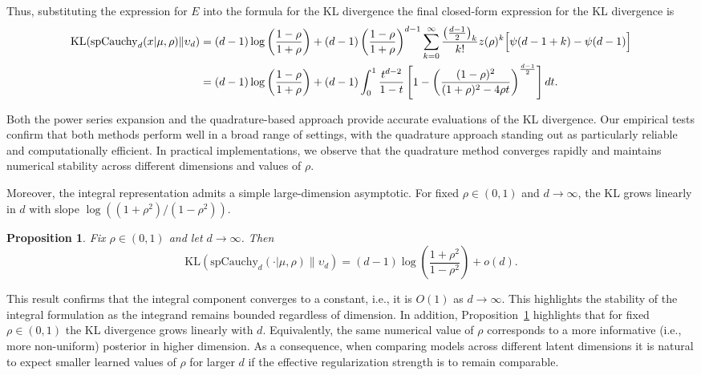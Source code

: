 \documentclass{article}
\newtheorem{prop}{Proposition}
\begin{document}
Thus, substituting the expression for \(E\) into the formula for the KL divergence the final closed-form expression for the KL divergence is
{\small
\begin{align*}
 \mathrm{KL}(\mathrm{spCauchy}_d(x | \mu, \rho) \| \upsilon_d) & = (d-1)\log\left(\frac{1-\rho}{1+\rho}\right) + (d-1)\left(\frac{1-\rho}{1+\rho}\right)^{d-1}\sum_{k=0}^{\infty}\frac{\left(\frac{d-1}{2}\right)_k}{k!}z(\rho)^k\Bigl[\psi(d-1+k)-\psi(d-1)\Bigr] \\
     & = (d-1)\log\left(\frac{1-\rho}{1+\rho}\right) + (d-1) \int_0^1 \frac{t^{d-2}}{1-t} \left[1 - \left(\frac{(1 -\rho)^2}{(1+\rho)^2 - 4 \rho t}\right)^{\frac{d-1}{2}} \right] dt.
\end{align*}
}

Both the power series expansion and the quadrature-based approach provide accurate evaluations of the KL divergence. Our empirical tests confirm that both methods perform well in a broad range of settings, with the quadrature approach standing out as particularly reliable and computationally efficient. In practical implementations, we observe that the quadrature method converges rapidly and maintains numerical stability across different dimensions and values of \( \rho \).

Moreover, the integral representation admits a simple large-dimension asymptotic.
For fixed $\rho\in(0,1)$ and $d\to\infty$, the KL grows linearly in $d$ with slope
$\log((1+\rho^2)/(1-\rho^2))$.


\begin{prop}\label{p:large-d}
Fix $\rho\in(0,1)$ and let $d\to\infty$. Then
\[
\mathrm{KL}\left(\mathrm{spCauchy}_d(\cdot|\mu,\rho)\|\upsilon_d\right)
=
(d-1)\log\left(\frac{1+\rho^2}{1-\rho^2}\right) + o(d).
\]
\end{prop}

This result confirms that the integral component converges to a constant, i.e., it is \(O(1)\) as \(d \to \infty\). This highlights the  stability of the integral formulation as the integrand remains bounded regardless of dimension. In addition, Proposition~\ref{p:large-d} highlights that for fixed $\rho\in(0,1)$ the KL divergence grows linearly with $d$. Equivalently, the same numerical value of $\rho$ corresponds to a more informative (i.e., more non-uniform) posterior in higher dimension. As a consequence, when comparing models across
different latent dimensions it is natural to expect smaller learned values of $\rho$ for larger $d$ if the effective regularization strength is to remain comparable.
\end{document}
